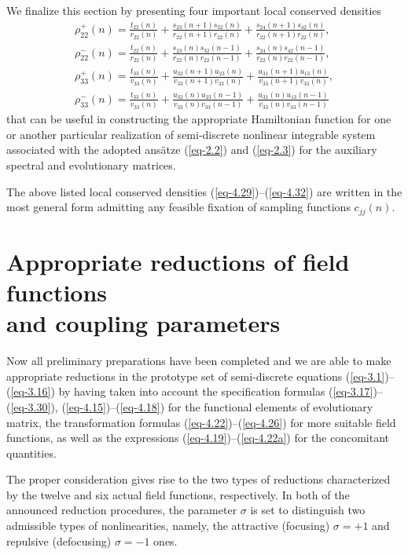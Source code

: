 \documentclass[pdftex]{sigma}
\numberwithin{equation}{section}
\begin{document}
We finalize this section by presenting four important local conserved densities \cite{vakhnenko-JNMP-18-401, vakhnenko-JNMP-18-415}
\begin{gather}\label{eq-4.29}
	\rho^{+}_{22}(n)=	\frac{t_{22}(n)}{r_{22}(n)} + \frac{s_{23}(n+1)s_{32}(n)}{r_{22}(n+1)r_{22}(n)} + \frac{s_{24}(n+1)s_{42}(n)}{r_{22}(n+1)r_{22}(n)},
\\ \label{eq-4.30}
	\rho^{-}_{22}(n)=	\frac{t_{22}(n)}{r_{22}(n)} + \frac{s_{23}(n)s_{32}(n-1)}{r_{22}(n)r_{22}(n-1)} + \frac{s_{24}(n)s_{42}(n-1)}{r_{22}(n)r_{22}(n-1)},
\\ \label{eq-4.31}
	\rho^{+}_{33}(n)=	\frac{t_{33}(n)}{v_{33}(n)} + \frac{u_{32}(n+1)u_{23}(n)}{v_{33}(n+1)v_{33}(n)} + \frac{u_{31}(n+1)u_{13}(n)}{v_{33}(n+1)v_{33}(n)},
\\ \label{eq-4.32}
	\rho^{-}_{33}(n)=	\frac{t_{33}(n)}{v_{33}(n)} + \frac{u_{32}(n)u_{23}(n-1)}{v_{33}(n)v_{33}(n-1)} + \frac{u_{31}(n)u_{13}(n-1)}{v_{33}(n)v_{33}(n-1)}
\end{gather}
that can be useful in constructing the appropriate Hamiltonian function for one or another particular realization of semi-discrete nonlinear integrable system associated with the adopted ans\"{a}tze (\ref{eq-2.2}) and (\ref{eq-2.3}) for the auxiliary spectral and evolutionary matrices.

The above listed local conserved densities (\ref{eq-4.29})--(\ref{eq-4.32}) are written in the most general form admitting any feasible fixation of sampling functions $c_{jj}(n)$.


\section[Appropriate reductions of field functions and coupling parameters]{Appropriate reductions of field functions\\ and coupling parameters}
\label{sec5}


Now all preliminary preparations have been completed and we are able to make appropriate reductions in the prototype set of semi-discrete equations (\ref{eq-3.1})--(\ref{eq-3.16}) by having taken into account the specification formulas (\ref{eq-3.17})--(\ref{eq-3.30}), (\ref{eq-4.15})--(\ref{eq-4.18}) for the functional elements of evolutionary matrix, the transformation formulas (\ref{eq-4.22})--(\ref{eq-4.26}) for more suitable field functions, as well as the expressions (\ref{eq-4.19})--(\ref{eq-4.22a}) for the concomitant quantities.

The proper consideration gives rise to the two types of reductions characterized by the twelve and six actual field functions, respectively.
In both of the announced reduction procedures, the parameter $\sigma$ is set to distinguish two admissible types of nonlinearities, namely, the attractive (focusing) $\sigma=+1$ and repulsive (defocusing) $\sigma=-1$ ones.
\end{document}
